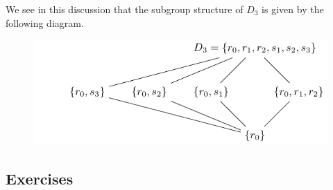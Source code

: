 \documentclass[
]{book}
\theoremstyle{definition}
\theoremstyle{definition}
\theoremstyle{definition}
\theoremstyle{definition}
\theoremstyle{remark}
\begin{document}
We see in this discussion that the subgroup structure of \(D_3\) is given by the following diagram.

\begin{figure}

{\centering \includegraphics[width=0.8\linewidth]{tikz/dihedral_subgroups} 

}

\end{figure}

\hypertarget{exercises-47}{%
\subsection{Exercises}\label{exercises-47}}
\end{document}
